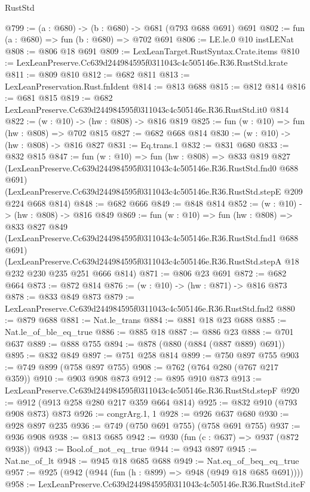 \begin{lexlean}{RustStd}
\begin{coremodule}
@799 := (a : @680) -> (b : @680) -> @681 (@793 @688 @691) @691
@802 := fun (a : @680) => fun (b : @680) => @702 @691
@806 := LE.le.{0} @10 instLENat
@808 := @806 @18 @691
@809 := LexLeanTarget.RustSyntax.Crate.items
@810 := LexLeanPreserve.Cc639d244984595f0311043c4c505146e.R36.RustStd.krate
@811 := @809 @810
@812 := @682 @811
@813 := LexLeanPreservation.Rust.fnIdent
@814 := @813 @688
@815 := @812 @814
@816 := @681 @815
@819 := @682 LexLeanPreserve.Cc639d244984595f0311043c4c505146e.R36.RustStd.it0 @814
@822 := (w : @10) -> (hw : @808) -> @816 @819
@825 := fun (w : @10) => fun (hw : @808) => @702 @815
@827 := @682 @668 @814
@830 := (w : @10) -> (hw : @808) -> @816 @827
@831 := Eq.trans.{1}
@832 := @831 @680
@833 := @832 @815
@847 := fun (w : @10) =>
  fun (hw : @808) =>
  @833
    @819
    @827
    (LexLeanPreserve.Cc639d244984595f0311043c4c505146e.R36.RustStd.fnd0 @688 @691)
    (LexLeanPreserve.Cc639d244984595f0311043c4c505146e.R36.RustStd.stepE @209 @224 @668 @814)
@848 := @682 @666
@849 := @848 @814
@852 := (w : @10) -> (hw : @808) -> @816 @849
@869 := fun (w : @10) =>
  fun (hw : @808) =>
  @833
    @827
    @849
    (LexLeanPreserve.Cc639d244984595f0311043c4c505146e.R36.RustStd.fnd1 @688 @691)
    (LexLeanPreserve.Cc639d244984595f0311043c4c505146e.R36.RustStd.stepA
      @18
      @232
      @230
      @235
      @251
      @666
      @814)
@871 := @806 @23 @691
@872 := @682 @664
@873 := @872 @814
@876 := (w : @10) -> (hw : @871) -> @816 @873
@878 := @833 @849 @873
@879 := LexLeanPreserve.Cc639d244984595f0311043c4c505146e.R36.RustStd.fnd2
@880 := @879 @688
@881 := Nat.le_trans
@884 := @881 @18 @23 @688
@885 := Nat.le_of_ble_eq_true
@886 := @885 @18
@887 := @886 @23
@888 := @701 @637
@889 := @888 @755
@894 := @878 (@880 (@884 (@887 @889) @691))
@895 := @832 @849
@897 := @751 @258 @814
@899 := @750 @897 @755
@903 := @749 @899 (@758 @897 @755)
@908 := @762 (@764 @280 (@767 @217 @359))
@910 := @903 @908 @873
@912 := @895 @910 @873
@913 := LexLeanPreserve.Cc639d244984595f0311043c4c505146e.R36.RustStd.stepF
@920 := @912 (@913 @258 @280 @217 @359 @664 @814)
@925 := @832 @910 (@793 @908 @873) @873
@926 := congrArg.{1, 1}
@928 := @926 @637 @680
@930 := @928 @897 @235
@936 := @749 (@750 @691 @755) (@758 @691 @755)
@937 := @936 @908
@938 := @813 @685
@942 := @930 (fun (c : @637) => @937 (@872 @938))
@943 := Bool.of_not_eq_true
@944 := @943 @897
@945 := Nat.ne_of_lt
@948 := @945 @18 @685 @688
@949 := Nat.eq_of_beq_eq_true
@957 := @925 (@942 (@944 (fun (h : @899) => @948 (@949 @18 @685 @691))))
@958 := LexLeanPreserve.Cc639d244984595f0311043c4c505146e.R36.RustStd.iteF

\end{coremodule}
\end{lexlean}
